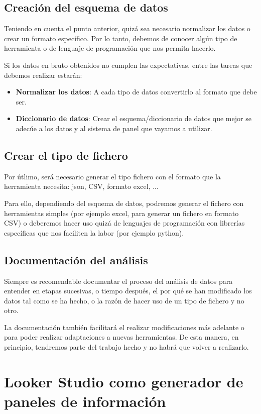 \section{Creación del esquema de datos}
Teniendo en cuenta el punto anterior, quizá sea necesario normalizar los datos o crear un formato específico. Por lo tanto, debemos de conocer algún tipo de herramienta o de lenguaje de programación que nos permita hacerlo.

Si los datos en bruto obtenidos no cumplen las expectativas, entre las tareas que debemos realizar estarán:

\begin{itemize}
    \item \textbf{Normalizar los datos}: A cada tipo de datos convertirlo al formato que debe ser.
    \item \textbf{Diccionario de datos}: Crear el esquema/diccionario de datos que mejor se adecúe a los datos y al sistema de panel que vayamos a utilizar.

\end{itemize}

\section{Crear el tipo de fichero}
Por útlimo, será necesario generar el tipo fichero con el formato que la herramienta necesita: json, CSV, formato excel, ...

Para ello, dependiendo del esquema de datos, podremos generar el fichero con herramientas simples (por ejemplo excel, para generar un fichero en formato CSV) o deberemos hacer uso quizá de lenguajes de programación con librerías específicas que nos faciliten la labor (por ejemplo python).

\section{Documentación del análisis}
Siempre es recomendable documentar el proceso del análisis de datos para entender en etapas sucesivas, o tiempo después, el por qué se han modificado los datos tal como se ha hecho, o la razón de hacer uso de un tipo de fichero y no otro.

La documentación también facilitará el realizar modificaciones más adelante o para poder realizar adaptaciones a nuevas herramientas. De esta manera, en principio, tendremos parte del trabajo hecho y no habrá que volver a realizarlo.

\chapter{Looker Studio como generador de paneles de información}

